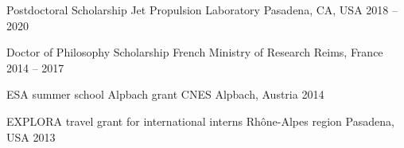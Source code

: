 

\begin{cvhonors}

  \cvhonor
  	{Postdoctoral Scholarship}
  	{Jet Propulsion Laboratory}
  	{Pasadena, CA, USA}
  	{2018 -- 2020}

  \cvhonor
  	{Doctor of Philosophy Scholarship}
  	{French Ministry of Research}
  	{Reims, France}
  	{2014 -- 2017}

  \cvhonor
  	{ESA summer school Alpbach grant}
  	{CNES}
  	{Alpbach, Austria}
  	{2014}

  \cvhonor
  	{EXPLORA travel grant for international interns}
  	{Rhône-Alpes region}
  	{Pasadena, USA}
  	{2013}

\end{cvhonors}
